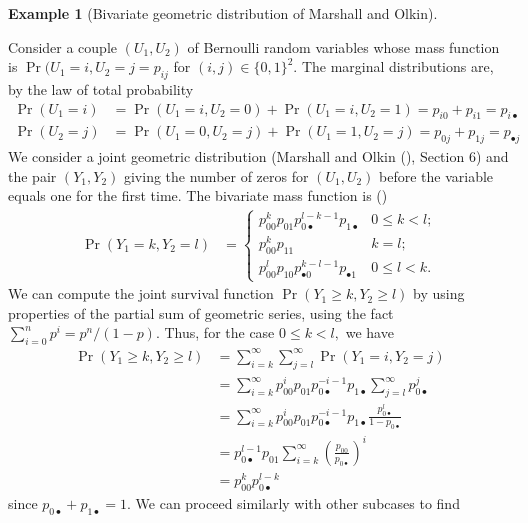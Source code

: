 \documentclass[
  11pt,
  letterpaper,
]{scrbook}
\theoremstyle{definition}
\newtheorem{example}{Example}[chapter]
\theoremstyle{plain}
\theoremstyle{plain}
\theoremstyle{plain}
\theoremstyle{definition}
\theoremstyle{definition}
\theoremstyle{plain}
\theoremstyle{plain}
\theoremstyle{remark}
\begin{document}
\begin{example}[Bivariate geometric distribution of Marshall and
Olkin]\protect\hypertarget{exm-biv-geometric}{}\label{exm-biv-geometric}

Consider a couple \((U_1, U_2)\) of Bernoulli random variables whose
mass function is \(\Pr(U_1=i, U_2=j=p_{ij}\) for
\((i,j) \in \{0,1\}^2.\) The marginal distributions are, by the law of
total probability \begin{align*}
\Pr(U_1=i) &= \Pr(U_1=i, U_2=0) + \Pr(U_1=i, U_2=1) = p_{i0} + p_{i1} = p_{i\bullet}\\
\Pr(U_2=j) &= \Pr(U_1=0, U_2=j) + \Pr(U_1=1, U_2=j) = p_{0j} + p_{1j} = p_{\bullet j}
\end{align*} We consider a joint geometric distribution (Marshall and
Olkin (), Section 6) and the
pair \((Y_1, Y_2)\) giving the number of zeros for \((U_1, U_2)\) before
the variable equals one for the first time. The bivariate mass function
is () \begin{align*}
\Pr(Y_1 = k, Y_2 = l) &= 
\begin{cases}
p_{00}^kp_{01}p_{0 \bullet}^{l-k-1}p_{1 \bullet} & 0 \leq k < l; \\
p_{00}^kp_{11} & k=l; \\
p_{00}^lp_{10}p_{\bullet 0}^{k-l-1}p_{\bullet 1} & 0 \leq l < k.
\end{cases}
\end{align*} We can compute the joint survival function
\(\Pr(Y_1 \ge k, Y_2 \ge l)\) by using properties of the partial sum of
geometric series, using the fact \(\sum_{i=0}^n p^i = p^n/(1-p).\) Thus,
for the case \(0\leq k < l,\) we have \begin{align*}
\Pr(Y_1 \ge k, Y_2 \ge l) &= \sum_{i=k}^\infty \sum_{j=l}^\infty \Pr(Y_1 = i, Y_2 = j)\\
&= \sum_{i=k}^\infty p_{00}^ip_{01}p_{0 \bullet}^{-i-1}p_{1 \bullet} \sum_{j=l}^\infty p_{0 \bullet}^{j}
\\&=\sum_{i=k}^\infty p_{00}^ip_{01}p_{0 \bullet}^{-i-1}p_{1 \bullet} \frac{p_{0 \bullet}^{l}}{1-p_{0\bullet}} \\&= p_{0 \bullet}^{l-1}p_{01} \sum_{i=k}^\infty \left(\frac{p_{00}}{p_{0 \bullet}}\right)^{i}
\\& = p_{00}^k p_{0 \bullet}^{l-k}
\end{align*} since \(p_{0\bullet} + p_{1\bullet} = 1.\) We can proceed
similarly with other subcases to find \begin{align*}

\end{align*}
\end{example}
\end{document}
